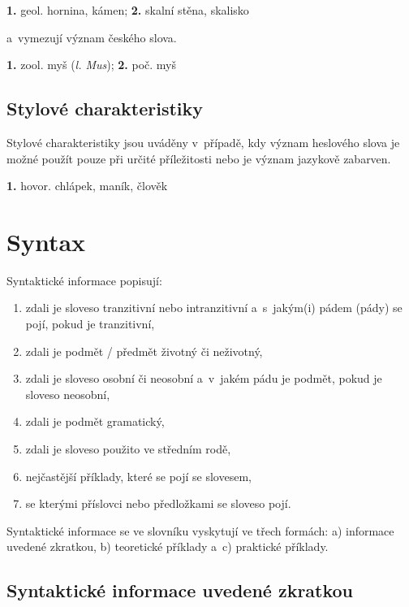 \blspace
  \dicEntry {}   {\textbf{1.}} {\footnotesize{geol.}} {hornina, kámen;} {\textbf{2.}}  {skalní stěna, skalisko}
\blspace

a~vymezují význam českého slova.

\blspace
  \dicEntry {}   {\textbf{1.}} {\footnotesize{zool.}} {myš} (\textit{l. Mus}); {\textbf{2.}} {\footnotesize{poč.}} {myš}
\blspace

\subsection*{Stylové charakteristiky}

Stylové charakteristiky jsou uváděny v~případě, kdy význam heslového slova je možné použít pouze při určité příležitosti nebo je význam jazykově zabarven.

\blspace
  \dicEntry {}   {\textbf{1.}} {\footnotesize{hovor.}} {chlápek, maník, člověk}
\blspace

\section{Syntax}

Syntaktické informace popisují:

\begin{enumerate}
\item zdali je sloveso tranzitivní nebo intranzitivní a~s~jakým(i) pádem (pády) se pojí, pokud je tranzitivní,
\item zdali je podmět / předmět životný či neživotný,
\item zdali je sloveso osobní či neosobní a~v~jakém pádu je podmět, pokud je sloveso neosobní,
\item zdali je podmět gramatický,
\item zdali je sloveso použito ve středním rodě,
\item nejčastější příklady, které se pojí se slovesem,
\item se kterými příslovci nebo předložkami se sloveso pojí.
\end{enumerate}

Syntaktické informace se ve slovníku vyskytují ve třech formách: a) informace uvedené zkratkou, b) teoretické příklady a~c) praktické příklady.

\subsection*{Syntaktické informace uvedené zkratkou}

